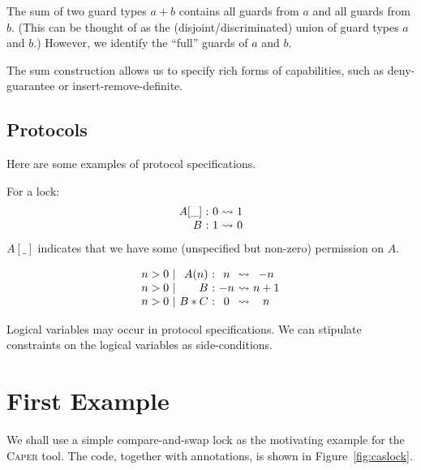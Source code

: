 \documentclass[a4paper]{article}
\begin{document}
The sum of two guard types $a + b$ contains all guards from $a$ and all guards from $b$.
(This can be thought of as the (disjoint/discriminated) union of guard types $a$ and $b$.)
However, we identify the ``full'' guards of $a$ and $b$.

The sum construction allows us to specify rich forms of capabilities, such as deny-guarantee or insert-remove-definite.

\subsection{Protocols}

Here are some examples of protocol specifications.

For a lock:
\[
\begin{array}{r@{\ :\ } c @{\ \rightsquigarrow\ } c}
  A [ \_ ] & 0 & 1 \\
  B & 1 & 0
\end{array}
\]
$A [ \_ ]$ indicates that we have some (unspecified but non-zero) permission on $A$.

\[
\begin{array}{c @{\ |\ } r@{\ :\ } c @{\ \rightsquigarrow\ } c}
  n > 0 & A (n) & n & -n \\
  n > 0 & B & -n & n+1 \\
  n > 0 & B * C & 0 & n \\
\end{array}
\]

Logical variables may occur in protocol specifications.
We can stipulate constraints on the logical variables as side-conditions.

\section{First Example}

We shall use a simple compare-and-swap lock as the motivating example for the \textsc{Caper} tool.
The code, together with annotations, is shown in Figure~\ref{fig:caslock}.
\end{document}
